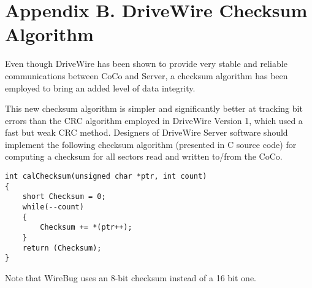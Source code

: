 \documentclass{article}
\begin{document}
\section{Appendix B. DriveWire Checksum Algorithm}
Even though DriveWire has been shown to provide very stable and reliable communications between CoCo and Server, a checksum algorithm has been employed to bring an added level of data integrity.

This new checksum algorithm is simpler and significantly better at tracking bit errors than the CRC algorithm employed in DriveWire Version 1, which used a fast but weak CRC method.
Designers of DriveWire Server software should implement the following checksum algorithm (presented in C source code) for computing a checksum for all sectors read and written to/from the CoCo.

\begin{lstlisting}
int calChecksum(unsigned char *ptr, int count)
{
	short Checksum = 0;
	while(--count)
	{
		Checksum += *(ptr++);
	}
	return (Checksum);
}
\end{lstlisting}

Note that WireBug uses an 8-bit checksum instead of a 16 bit one.
\end{document}
